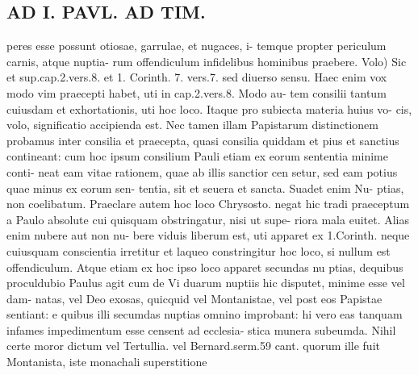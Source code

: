 \documentclass{article}
\begin{document}
\begin{pages}
\section*{AD I. PAVL. AD TIM. }
\marginpar{[ p.190 ]}peres esse possunt otiosae, garrulae, et nugaces, i- temque propter periculum carnis, atque nuptia- rum offendiculum infidelibus hominibus praebere. Volo) Sic et sup.cap.2.vers.8. et 1. Corinth. 7. vers.7. sed diuerso sensu. Haec enim vox modo vim praecepti habet, uti in cap.2.vers.8. Modo au- tem consilii tantum cuiusdam et exhortationis, uti hoc loco. Itaque pro subiecta materia huius vo- cis, volo, significatio accipienda est. Nec tamen illam Papistarum distinctionem probamus inter consilia et praecepta, quasi consilia quiddam et pius et sanctius contineant: cum hoc ipsum consilium Pauli etiam ex eorum sententia minime conti- neat eam vitae rationem, quae ab illis sanctior cen setur, sed eam potius quae minus ex eorum sen- tentia, sit et seuera et sancta. Suadet enim Nu- ptias, non coelibatum. Praeclare autem hoc loco Chrysosto. negat hic tradi praeceptum a Paulo absolute cui quisquam obstringatur, nisi ut supe- riora mala euitet. Alias enim nubere aut non nu- bere viduis liberum est, uti apparet ex 1.Corinth. neque cuiusquam conscientia irretitur et laqueo constringitur hoc loco, si nullum est offendiculum. Atque etiam ex hoc ipso loco apparet secundas nu ptias, dequibus proculdubio Paulus agit cum de Vi duarum nuptiis hic disputet, minime esse vel dam- natas, vel Deo exosas, quicquid vel Montanistae, vel post eos Papistae sentiant: e quibus illi secumdas nuptias omnino improbant: hi vero eas tanquam infames impedimentum esse censent ad ecclesia- stica munera subeumda. Nihil certe moror dictum vel Tertullia. vel Bernard.serm.59 cant. quorum ille fuit Montanista, iste monachali superstitione 

\end{pages}
\end{document}
